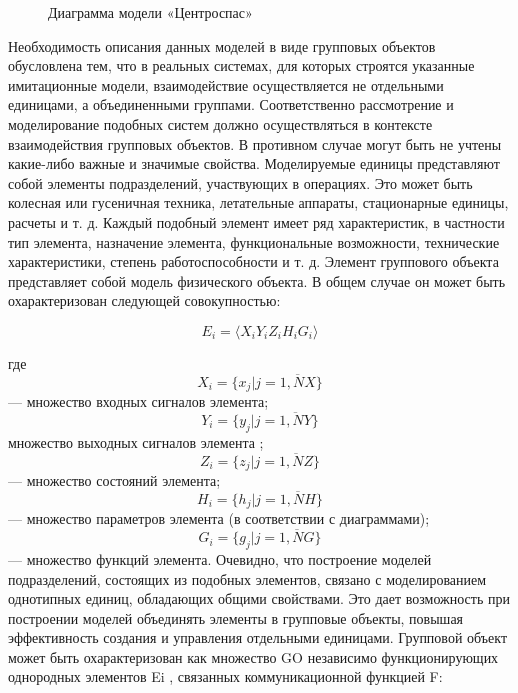 \documentclass[12pt]{article}
\begin{document}
\begin{figure}
\caption{Диаграмма модели «Центроспас»}
\label{6}
\end{figure}


Необходимость описания данных моделей в виде
групповых объектов обусловлена тем, что в реальных
системах, для которых строятся указанные имитационные модели, взаимодействие осуществляется не отдельными единицами, а объединенными группами. Соответственно рассмотрение и моделирование подобных
систем должно осуществляться в контексте взаимодействия групповых объектов. В противном случае могут
быть не учтены какие-либо важные и значимые
свойства.
Моделируемые единицы представляют собой элементы подразделений, участвующих в операциях. Это
может быть колесная или гусеничная техника, летательные аппараты, стационарные единицы, расчеты
и т. д. Каждый подобный элемент имеет ряд характеристик, в частности тип элемента, назначение элемента,
функциональные возможности, технические характеристики, степень работоспособности и т. д. Элемент
группового объекта представляет собой модель физического объекта. В общем случае он может быть охарактеризован следующей совокупностью:

\[E_{i}=\langle X_{i}Y_{i}Z_{i} H_{i}G_{i} \rangle \]

 где
\[X_{i}=\{ x_{j}|j = \overline{1,NX}\}\]
 — множество входных сигналов элемента;
\[Y_{i}=\{ y_{j}|j = \overline{1,NY}\}\]
множество выходных сигналов элемента ;
\[Z_{i}=\{ z_{j}|j = \overline{1,NZ}\}\]
 — множество состояний элемента;
\[H_{i}=\{ h_{j}|j = \overline{1,NH}\}\]
 — множество параметров элемента
(в соответствии с диаграммами); 
\[G_{i}=\{ g_{j}|j = \overline{1,NG}\}\]
— множество функций элемента.
Очевидно, что построение моделей подразделений,
состоящих из подобных элементов, связано с моделированием однотипных единиц, обладающих общими
свойствами. Это дает возможность при построении моделей объединять элементы в групповые объекты, повышая эффективность создания и управления отдельными единицами.
Групповой объект может быть охарактеризован как
множество GO независимо функционирующих однородных элементов Ei
, связанных коммуникационной
функцией F:
\end{document}

